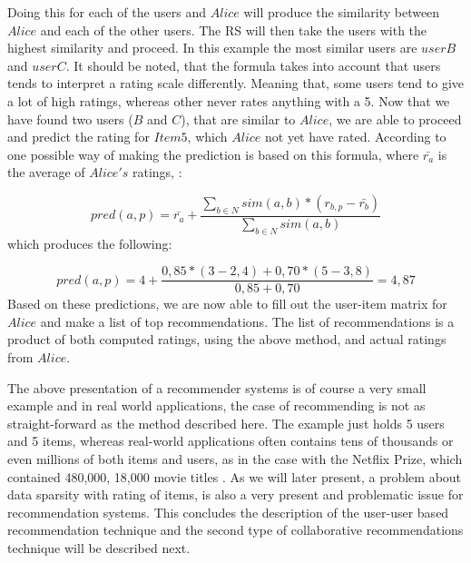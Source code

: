 Doing this for each of the users and \(Alice\) will produce the similarity between \(Alice\) and each of the other users. The RS will then take the users with the highest similarity and proceed. In this example the most similar users are \(userB\) and \(userC\). It should be noted, that the formula takes into account that users tends to interpret a rating scale differently. Meaning that, some users tend to give a lot of high ratings, whereas other never rates anything with a 5\citep[p. 15]{IntroductionRecommenderSystems}.\newline 
Now that we have found two users (\(B\) and \(C\)), that are similar to \(Alice\), we are able to proceed and predict the rating for \(Item5\), which \(Alice\) not yet have rated. According to \citet[p. 16]{IntroductionRecommenderSystems} one possible way of making the prediction is based on this formula, where $\bar{r_{a}}$ is the average of \(Alice's\) ratings,  :\newline

\[
	pred(a,p) = \bar{r_{a}} + \frac{\sum_{b\in N} sim(a,b) * (r_{b,p} - \bar{r_{b}})}{\sum_{b\in N} sim(a,b)}
\]
which produces the following: \newline

\[
	pred(a,p) = 4 + \frac{0,85*(3-2,4)+0,70*(5-3,8)}{0,85+0,70} = 4,87
\]
Based on these predictions, we are now able to fill out the user-item matrix for \(Alice\) and make a list of top recommendations. The list of recommendations is a product of both computed ratings, using the above method, and actual ratings from \(Alice\). \newline

The above presentation of a recommender systems is of course a very small example and in real world applications, the case of recommending is not as straight-forward as the method described here. The example just holds 5 users and 5 items, whereas real-world applications often contains tens of thousands or even millions of both items and users, as in the case with the Netflix Prize, which contained 480,000, 18,000 movie titles \citep{NetflixPrize}. As we will later present, a problem about data sparsity with rating of items, is also a very present and problematic issue for recommendation systems.\newline
This concludes the description of the user-user based recommendation technique and the second type of collaborative recommendations technique will be described next.

